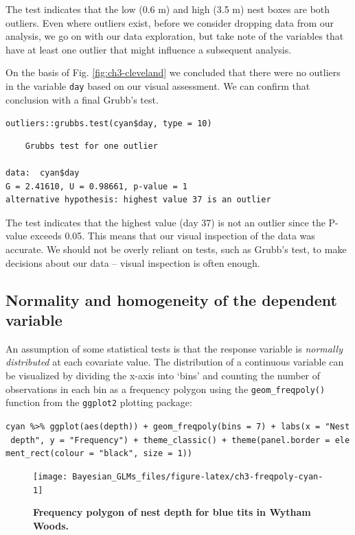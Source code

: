 \documentclass[
]{book}
\begin{document}
The test indicates that the low (0.6 m) and high (3.5 m) nest boxes are both outliers. Even where outliers exist, before we consider dropping data from our analysis, we go on with our data exploration, but take note of the variables that have at least one outlier that might influence a subsequent analysis.

On the basis of Fig. \ref{fig:ch3-cleveland} we concluded that there were no outliers in the variable \texttt{day} based on our visual assessment. We can confirm that conclusion with a final Grubb's test.

\texttt{outliers::grubbs.test(cyan\$day,\ type\ =\ 10)}

\begin{verbatim}
    Grubbs test for one outlier

data:  cyan$day
G = 2.41610, U = 0.98661, p-value = 1
alternative hypothesis: highest value 37 is an outlier
\end{verbatim}

The test indicates that the highest value (day 37) is not an outlier since the P-value exceeds 0.05. This means that our visual inspection of the data was accurate. We should not be overly reliant on tests, such as Grubb's test, to make decisions about our data -- visual inspection is often enough.

\hypertarget{normality-and-homogeneity-of-the-dependent-variable}{%
\subsection{Normality and homogeneity of the dependent variable}\label{normality-and-homogeneity-of-the-dependent-variable}}

An assumption of some statistical tests is that the response variable is \emph{normally distributed} at each covariate value. The distribution of a continuous variable can be visualized by dividing the x-axis into `bins' and counting the number of observations in each bin as a frequency polygon using the \texttt{geom\_freqpoly()} function from the \texttt{ggplot2} plotting package:

\texttt{cyan\ \%\textgreater{}\%\ ggplot(aes(depth))\ +\ geom\_freqpoly(bins\ =\ 7)\ +\ labs(x\ =\ "Nest\ depth",\ y\ =\ "Frequency")\ +\ theme\_classic()\ +\ theme(panel.border\ =\ element\_rect(colour\ =\ "black",\ size\ =\ 1))}



\begin{figure}

{\centering \texttt{[image: Bayesian\_GLMs\_files/figure-latex/ch3-freqpoly-cyan-1]} 

}

\caption{\textbf{Frequency polygon of nest depth for blue tits in Wytham Woods.}}\label{fig:ch3-freqpoly-cyan}
\end{figure}
\end{document}
